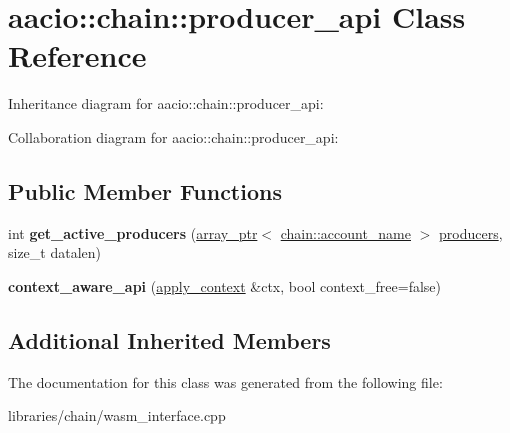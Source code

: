 \hypertarget{classaacio_1_1chain_1_1producer__api}{}\section{aacio\+:\+:chain\+:\+:producer\+\_\+api Class Reference}
\label{classaacio_1_1chain_1_1producer__api}


Inheritance diagram for aacio\+:\+:chain\+:\+:producer\+\_\+api\+:


Collaboration diagram for aacio\+:\+:chain\+:\+:producer\+\_\+api\+:
\subsection*{Public Member Functions}
\begin{DoxyCompactItemize}
\item 
\mbox{\label{classaacio_1_1chain_1_1producer__api_af1aa31caba2ad9717e7d857996e4b9c5}} 
int {\bfseries get\+\_\+active\+\_\+producers} (\mbox{\hyperlink{structaacio_1_1chain_1_1array__ptr}{array\+\_\+ptr}}$<$ \mbox{\hyperlink{structaacio_1_1chain_1_1name}{chain\+::account\+\_\+name}} $>$ \mbox{\hyperlink{structproducers}{producers}}, size\+\_\+t datalen)
\item 
\mbox{\label{classaacio_1_1chain_1_1producer__api_ad2711b0a72fe3f1b0b1512c97e16d285}} 
{\bfseries context\+\_\+aware\+\_\+api} (\mbox{\hyperlink{classaacio_1_1chain_1_1apply__context}{apply\+\_\+context}} \&ctx, bool context\+\_\+free=false)
\end{DoxyCompactItemize}
\subsection*{Additional Inherited Members}


The documentation for this class was generated from the following file\+:\begin{DoxyCompactItemize}
\item 
libraries/chain/wasm\+\_\+interface.\+cpp\end{DoxyCompactItemize}

